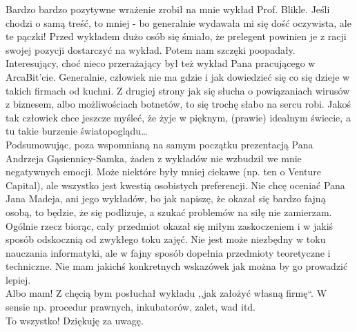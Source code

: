 \documentclass[a4paper,11pt]{article}
\begin{document}
Bardzo bardzo pozytywne wrażenie zrobił na mnie wykład Prof. Blikle. Jeśli chodzi
o samą treść, to mniej - bo generalnie wydawała mi się dość oczywista, ale te
pączki! Przed wykładem dużo osób się śmiało, że prelegent powinien je z racji
swojej pozycji dostarczyć na wykład. Potem nam szczęki poopadały.
\\

Interesujący, choć nieco przerażający był też wykład Pana pracującego w
ArcaBit'cie. Generalnie, człowiek nie ma gdzie i jak dowiedzieć się co się dzieje
w takich firmach od kuchni. Z drugiej strony jak się słucha o powiązaniach
wirusów z biznesem, albo możliwościach botnetów,
to się trochę słabo na sercu robi. Jakoś tak człowiek chce
jeszcze myśleć, że żyje w pięknym, (prawie) idealnym świecie, a tu takie
burzenie światopoglądu\ldots
\\

Podsumowując, poza wspomnianą na samym początku prezentacją
Pana Andrzeja Gąsiennicy-Samka, żaden z wykładów nie wzbudził we mnie negatywnych
emocji. Może niektóre były mniej ciekawe (np. ten o Venture Capital), ale
wszystko jest kwestią osobistych preferencji. Nie chcę oceniać Pana Jana Madeja,
ani jego wykładów, 
bo jak napiszę, że okazał się bardzo fajną osobą, to będzie, że się podlizuje,
a szukać problemów na siłę nie zamierzam. Ogólnie rzecz biorąc, cały przedmiot okazał
się miłym zaskoczeniem i w jakiś sposób odskocznią od zwykłego toku zajęć.
Nie jest może niezbędny w toku nauczania informatyki, ale w fajny sposób dopełnia
przedmioty teoretyczne i techniczne. Nie mam jakichś konkretnych wskazówek
jak można by go prowadzić lepiej.
\\

Albo mam! Z chęcią bym posłuchał wykładu ,,jak założyć własną firmę``. W sensie
np. procedur prawnych, inkubatorów, zalet, wad itd.
\\

To wszystko! Dziękuję za uwagę.
\end{document}
